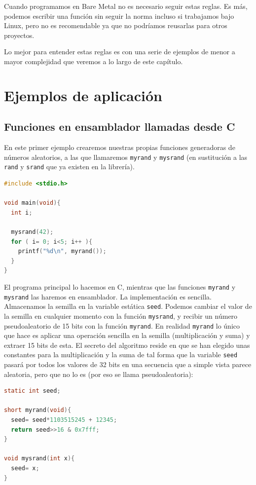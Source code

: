 Cuando programamos en Bare Metal no es necesario seguir estas reglas. Es más, podemos escribir
una función sin seguir la norma incluso si trabajamos bajo Linux, pero no es
recomendable ya que no podríamos reusarlas para otros proyectos.

Lo mejor para entender estas reglas es con una serie de ejemplos de menor a mayor complejidad
que veremos a lo largo de este capítulo.

\section{Ejemplos de aplicación}

\subsection{Funciones en ensamblador llamadas desde C}

En este primer ejemplo crearemos nuestras propias funciones generadoras de números
aleatorios, a las que llamaremos {\tt myrand} y {\tt mysrand}
(en sustitución a las {\tt rand} y {\tt srand} que ya existen en la librería).

\begin{lstlisting}[caption={Código del programa subrut1.c},label={lst:codigoPract3_1},language=C]
#include <stdio.h>

void main(void){
  int i;

  mysrand(42);
  for ( i= 0; i<5; i++ ){
    printf("%d\n", myrand());
  }
}
\end{lstlisting}

El programa principal lo hacemos en C, mientras que las funciones {\tt myrand} y {\tt mysrand}
las haremos en ensamblador. La implementación es sencilla. Almacenamos la semilla en la variable
estática {\tt seed}. Podemos cambiar el valor de la semilla en cualquier momento con la función
{\tt mysrand}, y recibir un número pseudoaleatorio de 15 bits con la función {\tt myrand}.
En realidad {\tt myrand} lo único que hace es aplicar una operación sencilla en la semilla
(multiplicación y suma) y extraer 15 bits de esta. El secreto del algoritmo reside en que se
han elegido unas constantes para la multiplicación y la suma de tal forma que la variable 
{\tt seed} pasará por todos los valores de 32 bits en una secuencia que a simple vista parece
aleatoria, pero que no lo es (por eso se llama pseudoaleatoria):

\begin{lstlisting}[language=C]
static int seed;

short myrand(void){
  seed= seed*1103515245 + 12345;
  return seed>>16 & 0x7fff;
}

void mysrand(int x){
  seed= x;
}
\end{lstlisting}

